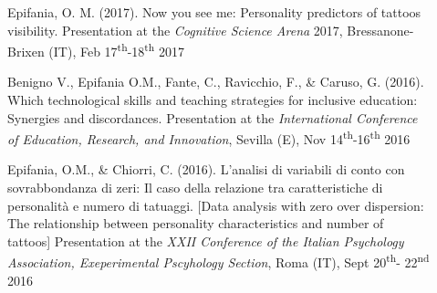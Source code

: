 \documentclass[letterpaper,12pt]{article}
\begin{document}
\begin{description}
	\item[] 	Epifania, O. M. (2017). Now you see me: Personality predictors of tattoos visibility. Presentation at the \emph{Cognitive Science Arena} 2017, Bressanone-Brixen (IT), Feb 17\textsuperscript{th}-18\textsuperscript{th} 2017
	
	\item[] 	Benigno V., Epifania O.M., Fante, C., Ravicchio, F., \& Caruso, G. (2016). Which technological skills and teaching strategies for inclusive education: Synergies and discordances. Presentation at the \emph{International Conference of Education, Research, and Innovation}, Sevilla (E), Nov  14\textsuperscript{th}-16\textsuperscript{th} 2016
	
	\item[] 	Epifania, O.M., \& Chiorri, C. (2016). L’analisi di variabili di conto con sovrabbondanza di zeri: Il caso della relazione tra caratteristiche di personalità e numero di tatuaggi. [Data analysis with zero over dispersion: The relationship between personality characteristics and number of tattoos] Presentation at the \emph{XXII Conference of the Italian Psychology Association, Exeperimental Pscyhology Section}, Roma (IT), Sept 20\textsuperscript{th}- 22\textsuperscript{nd} 2016
	
\end{description}
\end{document}
